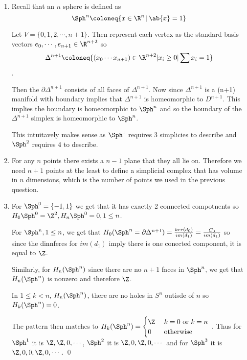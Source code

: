 \documentclass[12pt]{amsart}
\begin{document}
  \newpage
  \begin{problem}
  \begin{enumerate}
    \item Recall that an $n$ sphere is defined as 
      \[\Sph^n \coloneq \{x\in\R^n\,|\,\ab{x}=1\}\]
      \begin{claim}
        Let $V=\{0,1,2,\cdots,n+1\}$. Then represent each vertex as the standard basis vectors $e_0,\cdots, e_{n+1} \in \R^{n+2}$ so 
        \[\Delta^{n+1} \coloneq \{(x_0\cdots x_{n+1})\in \R^{n+2}| x_i \geq 0 | \sum x_i = 1\}\]. 

        Then the $\partial \Delta^{n+1}$ consists of all faces of $\Delta^{n+1}$. Now since $\Delta^{n+1}$ is a (n+1) manifold with boundary implies that $\Delta^{n+1}$ is homeomorphic to $D^{n+1}$. This implies the boundary is homeomorphic to $\Sph^n$ and so the boundary of the $\Delta^{n+1}$ simplex is homeomorphic to $\Sph^n$. 
      \end{claim}

      This intuitavely makes sense as $\Sph^1$ requires 3 simplicies to describe and $\Sph^2$ requires 4 to describe.  

    \item For any $n$ points there exists a $n-1$ plane that they all lie on. Therefore we need $n+1$ points at the least to define a simplicial complex that has volume in $n$ dimensions, which is the number of points we used in the previous question.    

    \item For $\Sph^0 = \{-1,1\}$ we get that it has exactly 2 connected compotnents so $H_0\Sph^0 = \Z^2, H_n\Sph^0 = 0, 1\leq n$. 

      For $\Sph^n, 1\leq n$, we get that $H_0(\Sph^n=\partial \Delta^{n+1}) = \frac{ker(d_0)}{im(d_1)} = \frac{C_0}{im(d_1)}$ so since the dinnferes for $im(d_1)$ imply there is one conected component, it is equal to $\Z$. 

      Similarly, for $H_n(\Sph^n)$ since there are no $n+1$ faces in $\Sph^n$, we get that $H_n(\Sph^n)$ is nonzero and therefore $\Z$. 

      In $1 \leq k < n$, $H_n(\Sph^n)$, there are no holes in $S^n$ outisde of $n$ so $H_k(\Sph^n)=0$.
    

    The pattern then matches to $H_k(\Sph^n) = \begin{cases}
      \Z & \text{ $k=0$ or $k=n$ } \\ 
      0 & \text{ otherwise}
    \end{cases}$. Thus for $\Sph^1$ it is $\Z, \Z, 0,\cdots$, $\Sph^2$ it is $\Z,0,\Z,0,\cdots$ and for $\Sph^3$ it is $\Z, 0,0,\Z,0,\cdots$. \qed 
  \end{enumerate}
  \end{problem}
  
\end{document}
